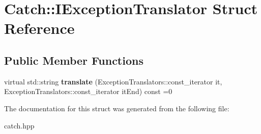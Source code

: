 \hypertarget{structCatch_1_1IExceptionTranslator}{}\section{Catch\+:\+:I\+Exception\+Translator Struct Reference}
\label{structCatch_1_1IExceptionTranslator}
\subsection*{Public Member Functions}
\begin{DoxyCompactItemize}
\item 
virtual std\+::string {\bfseries translate} (Exception\+Translators\+::const\+\_\+iterator it, Exception\+Translators\+::const\+\_\+iterator it\+End) const =0\hypertarget{structCatch_1_1IExceptionTranslator_a2a554b96ed5ed411e7c796b6b42837a5}{}\label{structCatch_1_1IExceptionTranslator_a2a554b96ed5ed411e7c796b6b42837a5}

\end{DoxyCompactItemize}


The documentation for this struct was generated from the following file\+:\begin{DoxyCompactItemize}
\item 
catch.\+hpp\end{DoxyCompactItemize}
